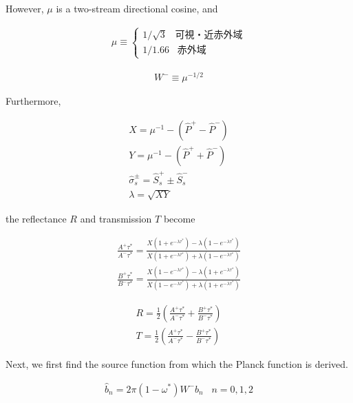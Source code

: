 However, \(\mu\) is a two-stream directional cosine, and

\begin{eqnarray}
  \mu \equiv \left\{ \begin{array}{ll}
                   1/\sqrt{3} \; \; \;  可視・近赤外域 \\
                   1/1.66     \; \; \;  赤外域
                    \end{array}
             \right.
\end{eqnarray}

\begin{eqnarray}
  W^- \equiv \mu^{-1/2}
\end{eqnarray}

Furthermore,

\begin{eqnarray}
  X  =  \mu^{-1} - (\hat{P}^+ - \hat{P}^- ) \\
  Y  =  \mu^{-1} - (\hat{P}^+ + \hat{P}^- ) \\
  \hat{\sigma}_s^{\pm}  =  \hat{S}_s^+ \pm \hat{S}_s^- \\
  \lambda  =  \sqrt{XY}
\end{eqnarray}

the reflectance \(R\) and transmission \(T\) become

\begin{eqnarray}
 \frac{A^+{\tau^*}}{A^-{\tau^*}}
   =  \frac{X (1+e^{-\lambda\tau^*}) - \lambda (1-e^{-\lambda\tau^*})}
             {X (1+e^{-\lambda\tau^*}) + \lambda (1-e^{-\lambda\tau^*})} \\
 \frac{B^+{\tau^*}}{B^-{\tau^*}}
   =  \frac{X (1-e^{-\lambda\tau^*}) - \lambda (1+e^{-\lambda\tau^*})}
             {X (1-e^{-\lambda\tau^*}) + \lambda (1+e^{-\lambda\tau^*})}
\end{eqnarray}

\begin{eqnarray}
  R  =   \frac{1}{2} \left(  \frac{A^+{\tau^*}}{A^-{\tau^*}} 
                             + \frac{B^+{\tau^*}}{B^-{\tau^*}} \right) \\
  T  =   \frac{1}{2} \left(  \frac{A^+{\tau^*}}{A^-{\tau^*}} 
                             - \frac{B^+{\tau^*}}{B^-{\tau^*}} \right)
\end{eqnarray}

Next, we first find the source function from which the Planck function
is derived.

\begin{eqnarray}
  \hat{b}_n = 2 \pi (1-\omega^*) W^- b_n \; \; \; n=0,1,2 
\end{eqnarray}

